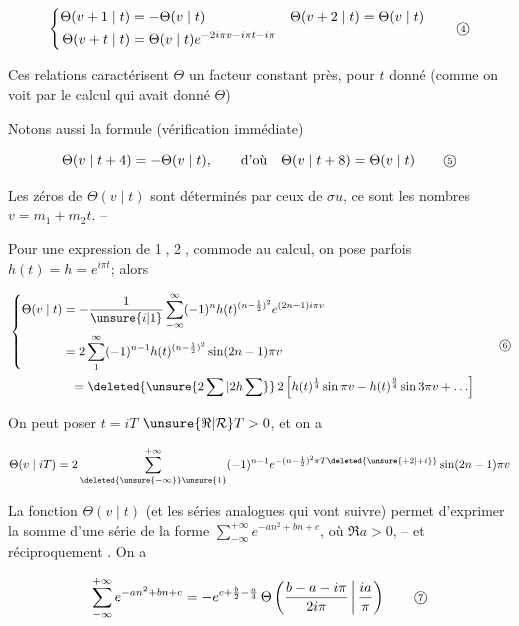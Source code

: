 \[
\left\{\begin{aligned}
\Theta(v+1\mid t)&=-\Theta(v\mid t)&\Theta(v+2\mid t)&=\Theta(v\mid t)\\
\Theta(v+t\mid t)&=\Theta(v\mid t)e^{-2i\pi v-i\pi t-i\pi}
\end{aligned}\right.
\tag*{\textcircled{\scriptsize 4}}
\]

Ces relations caractérisent $\Theta$  un facteur constant près, pour $t$ donné (comme on voit par le calcul qui avait donné $\Theta$)

Notons aussi la formule (vérification immédiate)

\[
\Theta(v\mid t+4)=-\Theta(v\mid t),\qquad\text{d'où}\quad\Theta(v\mid t+8)=\Theta(v\mid t)
\tag*{\textcircled{\scriptsize 5}}
\]

Les zéros de $\Theta(v\mid t)$ sont déterminés par ceux de $\sigma u$, ce sont les nombres $v=m_1+m_2 t$. --

Pour une expression de \textcircled{\scriptsize 1}, \textcircled{\scriptsize 2}, commode au calcul, on pose parfois $h(t)=h=e^{i\pi t}$; alors

\[
\begin{aligned}
&\left\{\begin{aligned}
\Theta(v\mid t)&=-\frac1{\unsure{i|1}}\sum_{-\infty}^{\infty}(-1)^n h(t)^{(n-\frac12)^2}e^{(2n-1)i\pi v}\\
&=2\sum_1^\infty(-1)^{n-1}h(t)^{(n-\frac12)^2}\sin(2n-1)\pi v
\end{aligned}\right.\\
&\hspace{5em}=\deleted{\unsure{2\sum|2h\sum}}\,2\left[h(t)^{\frac14}\sin\pi v-h(t)^{\frac94}\sin3\pi v+\ldots\right]
\end{aligned}
\tag*{\textcircled{\scriptsize 6}}
\]

On peut poser $t=iT$  $\unsure{\Re|\mathcal R}T>0$, et on a

\[
\Theta(v\mid iT)=2\sum_{\deleted{\unsure{-\infty}}\unsure{1}}^{+\infty}(-1)^{n-1}e^{-(n-\frac12)^2\pi T\deleted{\unsure{+2|+i}}}\sin(2n-1)\pi v
\]

La fonction $\Theta(v\mid t)$ (et les séries analogues qui vont suivre) permet d'exprimer la somme d'une série de la forme $\sum_{-\infty}^{+\infty}e^{-an^2+bn+c}$, où $\Re a>0$, -- et réciproquement . On a

\[
\sum_{-\infty}^{+\infty}e^{-an^2+bn+c}=-e^{c+\frac b2-\frac a4}\,\Theta\left(\frac{b-a-i\pi}{2i\pi}\,\middle|\,\frac{ia}{\pi}\right)
\tag*{\textcircled{\scriptsize 7}}
\]

